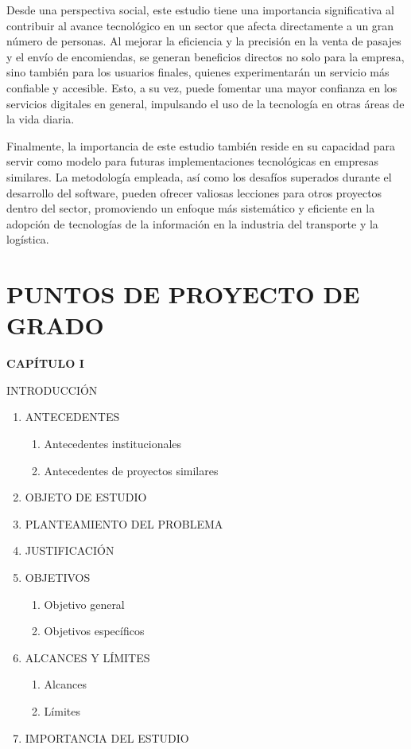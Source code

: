 \documentclass[12pt,letterpaper]{article}
\begin{document}
Desde una perspectiva social, este estudio tiene una importancia significativa al contribuir al avance tecnológico en un sector que afecta directamente a un gran número de personas. Al mejorar la eficiencia y la precisión en la venta de pasajes y el envío de encomiendas, se generan beneficios directos no solo para la empresa, sino también para los usuarios finales, quienes experimentarán un servicio más confiable y accesible. Esto, a su vez, puede fomentar una mayor confianza en los servicios digitales en general, impulsando el uso de la tecnología en otras áreas de la vida diaria.

Finalmente, la importancia de este estudio también reside en su capacidad para servir como modelo para futuras implementaciones tecnológicas en empresas similares. La metodología empleada, así como los desafíos superados durante el desarrollo del software, pueden ofrecer valiosas lecciones para otros proyectos dentro del sector, promoviendo un enfoque más sistemático y eficiente en la adopción de tecnologías de la información en la industria del transporte y la logística.

\section{PUNTOS DE PROYECTO DE GRADO}

\noindent \textbf{CAPÍTULO I}

\noindent INTRODUCCIÓN

\begin{enumerate}[nosep, label=1.\arabic*., left = 0pt .. \parindent]
    \item ANTECEDENTES
    \begin{enumerate}[nosep, label=1.\arabic{enumi}.\arabic*., left = 0pt .. \parindent]
    	\item Antecedentes institucionales
    	\item Antecedentes de proyectos similares
    \end{enumerate}
    \item OBJETO DE ESTUDIO
    \item PLANTEAMIENTO DEL PROBLEMA
    \item JUSTIFICACIÓN
    \item OBJETIVOS
    \begin{enumerate}[nosep, label=1.\arabic{enumi}.\arabic*., left = 0pt .. \parindent]
    	\item Objetivo general
        \item Objetivos específicos
    \end{enumerate}
    \item ALCANCES Y LÍMITES
    \begin{enumerate}[nosep, label=1.\arabic{enumi}.\arabic*., left = 0pt .. \parindent]
    		\item Alcances
        \item Límites
    \end{enumerate}
    \item IMPORTANCIA DEL ESTUDIO
\end{enumerate}
\end{document}

